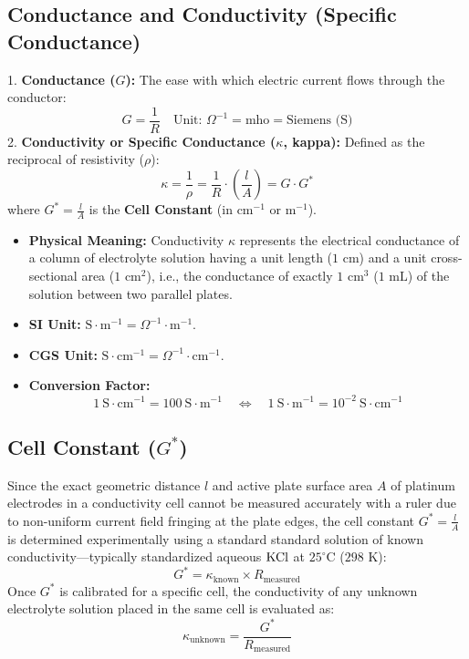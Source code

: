 \subsection{Conductance and Conductivity (Specific Conductance)}
1. \textbf{Conductance ($G$):} The ease with which electric current flows through the conductor:
\begin{equation}
    G = \frac{1}{R} \quad \text{Unit: } \Omega^{-1} = \text{mho} = \text{Siemens (S)}
\end{equation}
2. \textbf{Conductivity or Specific Conductance ($\kappa$, kappa):} Defined as the reciprocal of resistivity ($\rho$):
\begin{equation}
    \kappa = \frac{1}{\rho} = \frac{1}{R} \cdot \left(\frac{l}{A}\right) = G \cdot G^*
\end{equation}
where $G^* = \frac{l}{A}$ is the \textbf{Cell Constant} (in $\text{cm}^{-1}$ or $\text{m}^{-1}$).
\begin{itemize}[leftmargin=*]
    \item \textbf{Physical Meaning:} Conductivity $\kappa$ represents the electrical conductance of a column of electrolyte solution having a unit length ($1\text{ cm}$) and a unit cross-sectional area ($1\text{ cm}^2$), i.e., the conductance of exactly $1\text{ cm}^3$ ($1\text{ mL}$) of the solution between two parallel plates.
    \item \textbf{SI Unit:} $\text{S}\cdot\text{m}^{-1} = \Omega^{-1}\cdot\text{m}^{-1}$.
    \item \textbf{CGS Unit:} $\text{S}\cdot\text{cm}^{-1} = \Omega^{-1}\cdot\text{cm}^{-1}$.
    \item \textbf{Conversion Factor:}
    \begin{equation}
        1\ \text{S}\cdot\text{cm}^{-1} = 100\ \text{S}\cdot\text{m}^{-1} \quad \iff \quad 1\ \text{S}\cdot\text{m}^{-1} = 10^{-2}\ \text{S}\cdot\text{cm}^{-1}
    \end{equation}
\end{itemize}

\subsection{Cell Constant ($G^*$)}
Since the exact geometric distance $l$ and active plate surface area $A$ of platinum electrodes in a conductivity cell cannot be measured accurately with a ruler due to non-uniform current field fringing at the plate edges, the cell constant $G^* = \frac{l}{A}$ is determined experimentally using a standard standard solution of known conductivity—typically standardized aqueous $\ce{KCl}$ at $25^\circ\text{C}$ ($298\text{ K}$):
\begin{equation}
    G^* = \kappa_{\text{known}} \times R_{\text{measured}}
\end{equation}
Once $G^*$ is calibrated for a specific cell, the conductivity of any unknown electrolyte solution placed in the same cell is evaluated as:
\begin{equation}
    \kappa_{\text{unknown}} = \frac{G^*}{R_{\text{measured}}}
\end{equation}

